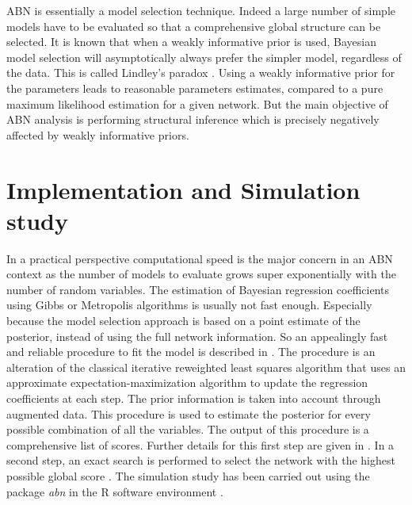 \documentclass{svproc}
\begin{document}
ABN is essentially a model selection technique. Indeed a large number of simple models have to be evaluated so that a comprehensive global structure can be selected. It is known that when a weakly informative prior is used, Bayesian model selection will asymptotically always prefer the simpler model, regardless of the data. This is called Lindley's paradox \cite{Lindley1957}. Using a weakly informative prior for the parameters leads to reasonable parameters estimates, compared to a pure maximum likelihood estimation for a given network.  But the main objective of ABN analysis is performing structural inference which is precisely negatively affected by weakly informative priors.

\section{Implementation and Simulation study} 
\label{sec:4}
In a practical perspective computational speed is the major concern in an ABN context as the number of models to evaluate grows super exponentially with the number of random variables. The estimation of Bayesian regression coefficients using Gibbs or Metropolis algorithms is usually not fast enough. Especially because the model selection approach is based on a point estimate of the posterior, instead of using the full network information. So an appealingly fast and reliable procedure to fit the model is described in \cite{gelman}. The procedure is an alteration of the classical iterative reweighted least squares algorithm that uses an approximate expectation-maximization algorithm to update the regression coefficients at each step. 
The prior information is taken into account through augmented data. 
This procedure is used to estimate the posterior for every possible combination of all the variables. 
The output of this procedure is a comprehensive list of scores. 
Further details for this first step are given in \cite{Krat:Furr}.
In a second step, an exact search is performed to select the network with the highest possible global score \cite{koivisto}. The simulation study has been carried out using the package \emph{abn} \cite{Kratzer} in the R software environment \cite{R}.
\end{document}

